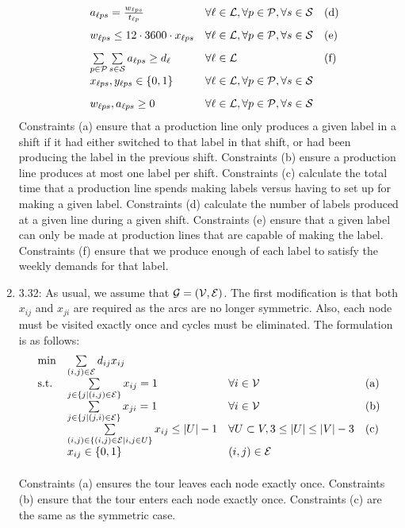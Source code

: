 \documentclass[10pt]{article}
\begin{document}
\begin{enumerate}
\[\begin{array}{llll}
    \\[3mm]
    & a_{\ell p s} = \frac{w_{\ell p s}}{t_{\ell p}} & \forall \ell \in {\cal L}, \forall p \in {\cal P}, \forall s \in {\cal S} & \mbox{(d)}
    \\[3mm]
    & w_{\ell p s} \leq 12 \cdot 3600 \cdot x_{\ell p s} & \forall
    \ell \in {\cal L}, \forall p \in {\cal P}, \forall s \in {\cal S} & \mbox{(e)} \\[3mm]
    & \sum\limits_{p \in {\cal P}} \sum\limits_{s \in {\cal S}} a_{\ell p s} \ge d_{\ell} & \forall \ell \in {\cal L} & \mbox{(f)} \\ [3mm]
    & x_{\ell p s}, y_{\ell p s} \in \{0,1\} &  \forall
    \ell \in {\cal L}, \forall p \in {\cal P}, \forall s \in {\cal S} & \\[3mm]
    & w_{\ell p s}, a_{\ell p s} \geq 0 &  \forall
    \ell \in {\cal L}, \forall p \in {\cal P}, \forall s \in {\cal S} &
  \end{array}
  \]
  Constraints (a) ensure that a production line only produces a given
  label in a shift if it had either switched to that label in that
  shift, or had been producing the label in the previous
  shift. Constraints (b) ensure a production line produces at most one
  label per shift. Constraints (c) calculate the total time that a
  production line spends making labels versus having to set up for
  making a given label. Constraints (d) calculate the number of labels
  produced at a given line during a given shift. Constraints (e)
  ensure that a given label can only be made at production lines that are
  capable of making the label.  Constraints (f) ensure that we produce enough of each label to satisfy the weekly demands for that label.

\item 3.32: As usual, we assume that ${\cal G} = ({\cal V},{\cal E})$. The first modification is that both $x_{ij}$ and $x_{ji}$
  are required as the arcs are no longer symmetric. Also, each node
  must be visited exactly once and cycles must be eliminated. The formulation is
  as follows:
  \[
  \begin{array}{llll}
    \min & \sum\limits_{(i,j) \in {\cal E}} d_{ij} x_{ij} & & \\[3mm]
    \mbox{s.t.} & \sum\limits_{j \in \{j | (i,j) \in {\cal E}\}} x_{ij} = 1 &
    \forall i \in {\cal V} & \mbox{(a)} \\[3mm]
    & \sum\limits_{j \in \{j | (j,i) \in {\cal E}\}} x_{ji} = 1 &
    \forall i \in {\cal V} & \mbox{(b)} \\[3mm]
    & \sum\limits_{(i,j) \in \{(i,j) \in {\cal E} | i,j \in U\}} x_{ij} \leq |U| -
    1 & \forall U \subset V, 3 \leq |U| \leq |V| - 3 & \mbox{(c)} \\[3mm]
    & x_{ij} \in \{0,1\} & (i,j) \in {\cal E} & \\[3mm]
  \end{array}
  \]
  Constraints (a) ensures the tour leaves each node exactly
  once. Constraints (b) ensure that the tour enters each node exactly
  once. Constraints (c) are the same as the symmetric case.

\end{enumerate}
  
\end{document}
